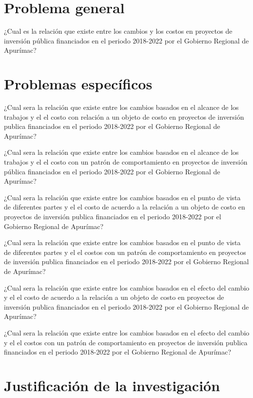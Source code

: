 \section{Problema general}

¿Cual es la relación que existe entre los cambios y los costos en proyectos de inversión pública financiados en el periodo 2018-2022 por el Gobierno Regional de Apurímac?

\section{Problemas específicos}

¿Cual sera la relación que existe entre los cambios basados en el alcance de los trabajos y el  el costo con relación a un objeto de costo en proyectos de inversión publica financiados en el periodo 2018-2022 por el Gobierno Regional de Apurímac?

¿Cual sera la relación que existe entre los cambios basados en el alcance de los trabajos y el  el costo con un patrón de comportamiento en proyectos de inversión pública financiados en el periodo 2018-2022 por el Gobierno Regional de Apurímac?

¿Cual sera la relación que existe entre los cambios basados en el punto de vista de diferentes partes y el  el costo de acuerdo a la relación a un objeto de costo en proyectos de inversión publica financiados en el periodo 2018-2022 por el Gobierno Regional de Apurímac?

¿Cual sera la relación que existe entre los cambios basados en el punto de vista de diferentes partes y el  el costos con un patrón de comportamiento en proyectos de inversión publica financiados en el periodo 2018-2022 por el Gobierno Regional de Apurímac?

¿Cual sera la relación que existe entre los cambios basados en el efecto del cambio y el  el costo de acuerdo a la relación a un objeto de costo en proyectos de inversión publica financiados en el periodo 2018-2022 por el Gobierno Regional de Apurímac?

¿Cual sera la relación que existe entre los cambios basados en el efecto del cambio y el  el costos con un  patrón de comportamiento en proyectos de inversión publica financiados en el periodo 2018-2022 por el Gobierno Regional de Apurímac?


\section{Justificación de la investigación}

